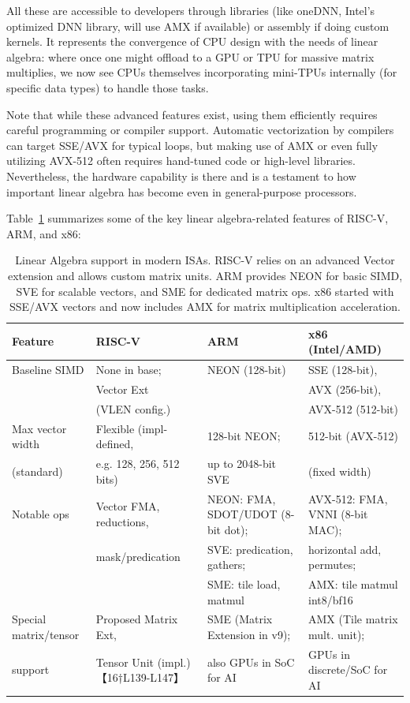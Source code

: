 All these are accessible to developers through libraries (like oneDNN, Intel’s optimized DNN library, will use AMX if available) or assembly if doing custom kernels. It represents the convergence of CPU design with the needs of linear algebra: where once one might offload to a GPU or TPU for massive matrix multiplies, we now see CPUs themselves incorporating mini-TPUs internally (for specific data types) to handle those tasks.

Note that while these advanced features exist, using them efficiently requires careful programming or compiler support. Automatic vectorization by compilers can target SSE/AVX for typical loops, but making use of AMX or even fully utilizing AVX-512 often requires hand-tuned code or high-level libraries. Nevertheless, the hardware capability is there and is a testament to how important linear algebra has become even in general-purpose processors.

Table~\ref{isa-table} summarizes some of the key linear algebra-related features of RISC-V, ARM, and x86:


\begin{table}[hbt]
\centering
\begin{tabular}{|p{2.7cm}|p{3.8cm}|p{3.8cm}|p{3.5cm}|}
\hline 
\textbf{Feature} & \textbf{RISC-V} & \textbf{ARM} & \textbf{x86 (Intel/AMD)} \\
\hline 
Baseline SIMD & None in base; & NEON (128-bit) & SSE (128-bit), \\
 & Vector Ext  &  & AVX (256-bit), \\
 & (VLEN config.) & & AVX-512 (512-bit) \\
\hline
Max vector width & Flexible (impl-defined, & 128-bit NEON; & 512-bit (AVX-512) \\
 (standard) & e.g. 128, 256, 512 bits) &  up to 2048-bit SVE & (fixed width) \\
\hline
Notable ops & Vector FMA, reductions, & NEON: FMA, SDOT/UDOT (8-bit dot); & AVX-512: FMA, VNNI (8-bit MAC); \\
 & mask/predication & SVE: predication, gathers; & horizontal add, permutes; \\
 &  & SME: tile load, matmul & AMX: tile matmul int8/bf16 \\
\hline
Special matrix/tensor & Proposed Matrix Ext, & SME (Matrix Extension in v9); & AMX (Tile matrix mult. unit); \\
 support & Tensor Unit (impl.) 【16†L139-L147】 & also GPUs in SoC for AI & GPUs in discrete/SoC for AI \\
\hline
\end{tabular}
\caption{Linear Algebra support in modern ISAs. RISC-V relies on an advanced Vector extension and allows custom matrix units. ARM provides NEON for basic SIMD, SVE for scalable vectors, and SME for dedicated matrix ops. x86 started with SSE/AVX vectors and now includes AMX for matrix multiplication acceleration.}
\label{isa-table}
\end{table}



